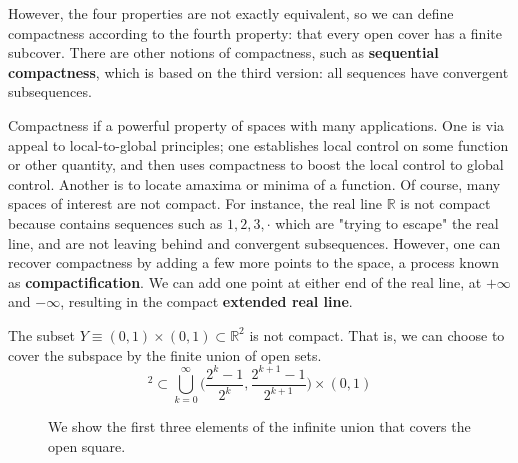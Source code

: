     However, the four properties are not exactly equivalent, so we can define compactness according to the fourth property: that every open cover has a finite subcover. There are other notions of compactness, such as \textbf{sequential compactness}, which is based on the third version: all sequences have convergent subsequences. 

    Compactness if a powerful property of spaces with many applications. One is via appeal to local-to-global principles; one establishes local control on some function or other quantity, and then uses compactness to boost the local control to global control. Another is to locate amaxima or minima of a function. Of course, many spaces of interest are not compact. For instance, the real line $\mathbb{R}$ is not compact because contains sequences such as $1, 2, 3, \cdot$ which are "trying to escape" the real line, and are not leaving behind and convergent subsequences. However, one can recover compactness by adding a few more points to the space, a process known as \textbf{compactification}. We can add one point at either end of the real line, at $+\infty$ and $-\infty$, resulting in the compact \textbf{extended real line}. 

    \begin{example}
      The subset $Y \equiv (0,1) \times (0,1) \subset \mathbb{R}^2$ is not compact. That is, we can choose to cover the subspace by the finite union of open sets. 
      \begin{equation}
        [0,1]^2 \subset \bigcup_{k=0}^\infty \Big( \frac{2^k - 1}{2^k}, \frac{2^{k+1} - 1}{2^{k+1}} \Big) \times (0,1)
      \end{equation}

      \begin{figure}[H]
        \centering 
        \caption{We show the first three elements of the infinite union that covers the open square. }
        \label{fig:closed_square_compact}
      \end{figure}
      \begin{center}
      \end{center}
    \end{example}

